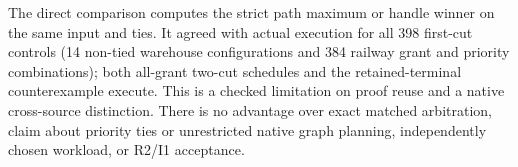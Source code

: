 \documentclass[11pt]{article}
\begin{document}
The direct comparison computes the strict path maximum or handle winner on the same input and ties. It agreed with actual execution for all 398 first-cut controls (14 non-tied warehouse configurations and 384 railway grant and priority combinations); both all-grant two-cut schedules and the retained-terminal counterexample execute. This is a checked limitation on proof reuse and a native cross-source distinction. There is no advantage over exact matched arbitration, claim about priority ties or unrestricted native graph planning, independently chosen workload, or R2/I1 acceptance.
\end{document}
